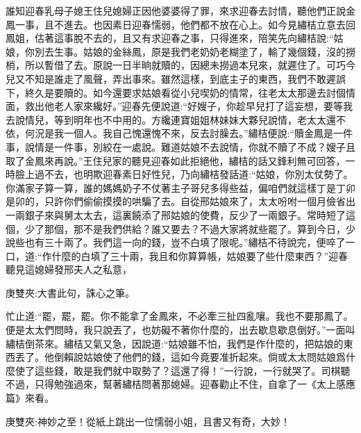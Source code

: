 \begin{parag}
    誰知迎春乳母子媳王住兒媳婦正因他婆婆得了罪，來求迎春去討情，聽他們正說金鳳一事，且不進去。也因素日迎春懦弱，他們都不放在心上。如今見繡桔立意去回鳳姐，估著這事脫不去的，且又有求迎春之事，只得進來，陪笑先向繡桔說:“姑娘，你別去生事。姑娘的金絲鳳，原是我們老奶奶老糊塗了，輸了幾個錢，沒的撈梢，所以暫借了去。原說一日半晌就贖的，因總未撈過本兒來，就遲住了。可巧今兒又不知是誰走了風聲，弄出事來。雖然這樣，到底主子的東西，我們不敢遲誤下，終久是要贖的。如今還要求姑娘看從小兒喫奶的情常，往老太太那邊去討個情面，救出他老人家來纔好。”迎春先便說道:“好嫂子，你趁早兒打了這妄想，要等我去說情兒，等到明年也不中用的。方纔連寶姐姐林妹妹大夥兒說情，老太太還不依，何況是我一個人。我自己愧還愧不來，反去討臊去。”繡桔便說:“贖金鳳是一件事，說情是一件事，別絞在一處說。難道姑娘不去說情，你就不贖了不成？嫂子且取了金鳳來再說。”王住兒家的聽見迎春如此拒絕他，繡桔的話又鋒利無可回答，一時臉上過不去，也明欺迎春素日好性兒，乃向繡桔發話道:“姑娘，你別太仗勢了。你滿家子算一算，誰的媽媽奶子不仗著主子哥兒多得些益，偏咱們就這樣丁是丁卯是卯的，只許你們偷偷摸摸的哄騙了去。自從邢姑娘來了，太太吩咐一個月儉省出一兩銀子來與舅太太去，這裏饒添了邢姑娘的使費，反少了一兩銀子。常時短了這個，少了那個，那不是我們供給？誰又要去？不過大家將就些罷了。算到今日，少說些也有三十兩了。我們這一向的錢，豈不白填了限呢。”繡桔不待說完，便啐了一口，道:“作什麼的白填了三十兩，我且和你算算帳，姑娘要了些什麼東西？”迎春聽見這媳婦發邢夫人之私意，\begin{note}庚雙夾:大書此句，誅心之筆。\end{note}忙止道:“罷，罷，罷。你不能拿了金鳳來，不必牽三扯四亂嚷。我也不要那鳳了。便是太太們問時，我只說丟了，也妨礙不著你什麼的，出去歇息歇息倒好。”一面叫繡桔倒茶來。繡桔又氣又急，因說道:“姑娘雖不怕，我們是作什麼的，把姑娘的東西丟了。他倒賴說姑娘使了他們的錢，這如今竟要准折起來。倘或太太問姑娘爲什麼使了這些錢，敢是我們就中取勢了？這還了得！”一行說，一行就哭了。司棋聽不過，只得勉強過來，幫著繡桔問著那媳婦。迎春勸止不住，自拿了一《太上感應篇》來看。\begin{note}庚雙夾:神妙之至！從紙上跳出一位懦弱小姐，且書又有奇，大妙！\end{note}
\end{parag}


